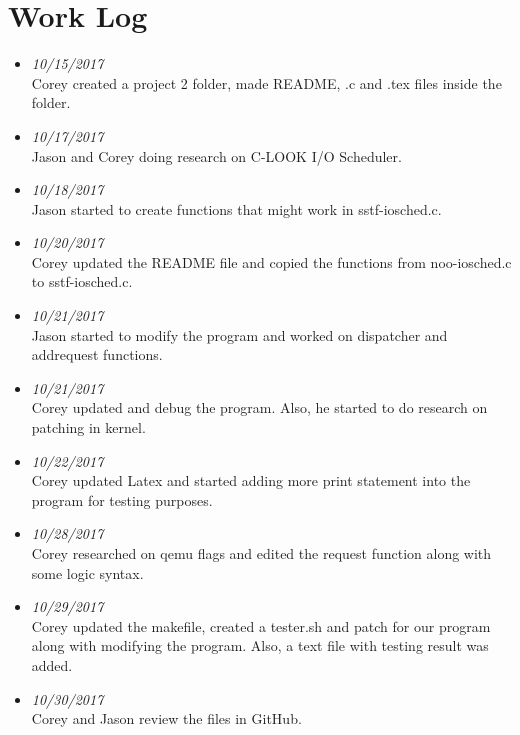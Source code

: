 \documentclass[onecolumn, draftclsnofoot,10pt, compsoc]{IEEEtran}
\begin{document}
\section{Work Log}
\begin{itemize}

\item \textit{10/15/2017}\\ Corey created a project 2 folder, made README, .c and .tex files inside the folder. \\
\item \textit{10/17/2017}\\ Jason and Corey doing research on C-LOOK I/O Scheduler. \\
\item \textit{10/18/2017}\\ Jason started to create functions that might work in sstf-iosched.c. \\ 
\item \textit{10/20/2017}\\ Corey updated the README file and copied the functions from noo-iosched.c to sstf-iosched.c. \\
\item \textit{10/21/2017}\\ Jason started to modify the program and worked on dispatcher and addrequest functions. \\
\item \textit{10/21/2017}\\ Corey updated and debug the program. Also, he started to do research on patching in kernel. \\ 
\item \textit{10/22/2017}\\ Corey updated Latex and started adding more print statement into the program for testing purposes. \\
\item \textit{10/28/2017}\\ Corey researched on qemu flags and edited the request function along with some logic syntax. \\
\item \textit{10/29/2017}\\ Corey updated the makefile, created a tester.sh and patch for our program along with modifying the program. Also, a text file with testing result was added. \\
\item \textit{10/30/2017}\\ Corey and Jason review the files in GitHub. \\
\end{itemize} 
\end{document}
